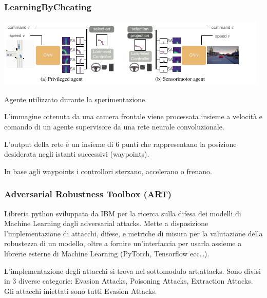 \documentclass{beamer}
\begin{document}
\begin{frame}
    \frametitle{LearningByCheating}
    
    \includegraphics[width=\textwidth]{agenti.png}

    Agente utilizzato durante la sperimentazione.

    L'immagine ottenuta da una  camera frontale viene processata insieme a velocità e comando di un agente supervisore da una rete neurale convoluzionale.
    
    L'output della rete è un insieme di 6 punti che rappresentano la posizione desiderata negli istanti successivi (waypoints).
    
    In base agli waypoints i controllori sterzano, accelerano o frenano.
\end{frame}

\begin{frame}
    \frametitle{Adversarial Robustness Toolbox (ART)}
    
    \begin{block}{\vspace*{-3ex}}
    Libreria python sviluppata da IBM per la ricerca sulla difesa dei modelli di Machine Learning dagli adversarial attacks.
    Mette a disposizione l'implementazione di attacchi, difese, e metriche di misura per la valutazione della robustezza di un modello, oltre a fornire
    un'interfaccia per usarla assieme a librerie esterne di Machine Learning (PyTorch, Tensorflow ecc\dots).
    \end{block}

    \begin{block}{\vspace*{-3ex}}
    L'implementazione degli attacchi si trova nel sottomodulo art.attacks. Sono divisi in 3 diverse categorie:
    Evasion Attacks, Poisoning Attacks, Extraction Attacks. Gli attacchi iniettati sono tutti Evasion Attacks.
    \end{block}
\end{frame}


    
\end{document}
